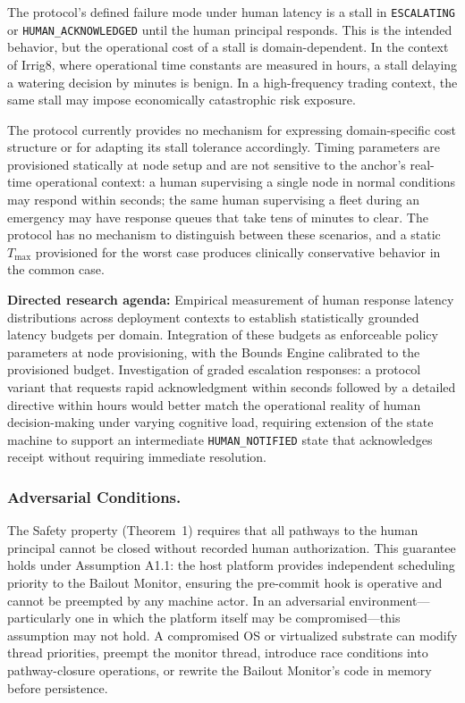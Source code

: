 The protocol's defined failure mode under human latency is a stall in \texttt{ESCALATING} or \texttt{HUMAN\_ACKNOWLEDGED} until the human principal responds. This is the intended behavior, but the operational cost of a stall is domain-dependent. In the context of Irrig8, where operational time constants are measured in hours, a stall delaying a watering decision by minutes is benign. In a high-frequency trading context, the same stall may impose economically catastrophic risk exposure.

The protocol currently provides no mechanism for expressing domain-specific cost structure or for adapting its stall tolerance accordingly. Timing parameters are provisioned statically at node setup and are not sensitive to the anchor's real-time operational context: a human supervising a single node in normal conditions may respond within seconds; the same human supervising a fleet during an emergency may have response queues that take tens of minutes to clear. The protocol has no mechanism to distinguish between these scenarios, and a static $T_{\max}$ provisioned for the worst case produces clinically conservative behavior in the common case.

\textbf{Directed research agenda:} Empirical measurement of human response latency distributions across deployment contexts to establish statistically grounded latency budgets per domain. Integration of these budgets as enforceable policy parameters at node provisioning, with the Bounds Engine calibrated to the provisioned budget. Investigation of graded escalation responses: a protocol variant that requests rapid acknowledgment within seconds followed by a detailed directive within hours would better match the operational reality of human decision-making under varying cognitive load, requiring extension of the state machine to support an intermediate \texttt{HUMAN\_NOTIFIED} state that acknowledges receipt without requiring immediate resolution.

\subsubsection{Adversarial Conditions.}
\label{sec:adversarial-limitations}

The Safety property (Theorem~1) requires that all pathways to the human principal cannot be closed without recorded human authorization. This guarantee holds under Assumption A1.1: the host platform provides independent scheduling priority to the Bailout Monitor, ensuring the pre-commit hook is operative and cannot be preempted by any machine actor. In an adversarial environment---particularly one in which the platform itself may be compromised---this assumption may not hold. A compromised OS or virtualized substrate can modify thread priorities, preempt the monitor thread, introduce race conditions into pathway-closure operations, or rewrite the Bailout Monitor's code in memory before persistence.

